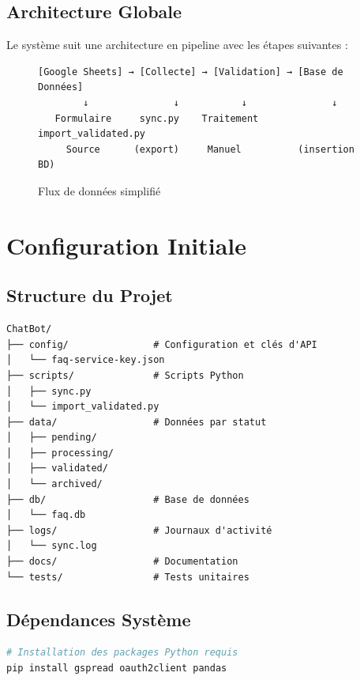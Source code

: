 \documentclass[11pt,a4paper]{article}
\begin{document}
\subsection{Architecture Globale}
Le système suit une architecture en pipeline avec les étapes suivantes :

\begin{figure}[H]
    \centering
    \begin{minipage}{0.9\textwidth}
\begin{lstlisting}
[Google Sheets] → [Collecte] → [Validation] → [Base de Données]
        ↓               ↓           ↓               ↓
   Formulaire     sync.py    Traitement     import_validated.py
     Source      (export)     Manuel          (insertion BD)
\end{lstlisting}
    \end{minipage}
    \caption{Flux de données simplifié}
\end{figure}

\section{Configuration Initiale}
\label{sec:initial-config}

\subsection{Structure du Projet}
\begin{lstlisting}
ChatBot/
├── config/               # Configuration et clés d'API
│   └── faq-service-key.json
├── scripts/              # Scripts Python
│   ├── sync.py
│   └── import_validated.py
├── data/                 # Données par statut
│   ├── pending/
│   ├── processing/
│   ├── validated/
│   └── archived/
├── db/                   # Base de données
│   └── faq.db
├── logs/                 # Journaux d'activité
│   └── sync.log
├── docs/                 # Documentation
└── tests/                # Tests unitaires
\end{lstlisting}

\subsection{Dépendances Système}
\begin{lstlisting}[language=bash]
# Installation des packages Python requis
pip install gspread oauth2client pandas
\end{lstlisting}
\end{document}
